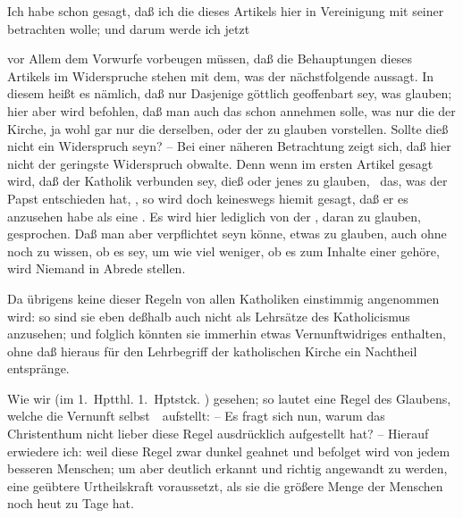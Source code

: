 Ich habe schon gesagt, daß ich die  dieses Artikels hier in Vereinigung mit seiner  betrachten wolle; und darum werde ich jetzt
\begin{aufza}
\item vor Allem dem Vorwurfe vorbeugen müssen, daß die Behauptungen dieses Artikels im Widerspruche stehen mit dem, was der nächstfolgende aussagt. In diesem heißt es nämlich, daß nur Dasjenige göttlich geoffenbart sey, was glauben; hier aber wird befohlen, daß man auch das schon annehmen solle, was nur die  der Kirche, ja wohl gar nur die  derselben, oder der  zu glauben vorstellen. Sollte dieß nicht ein Widerspruch seyn? -- Bei einer näheren Betrachtung zeigt sich, daß hier nicht der geringste Widerspruch obwalte. Denn wenn im ersten Artikel gesagt wird, daß der Katholik verbunden sey, dieß oder jenes zu glauben, \zB\ das, was der Papst entschieden hat, \udgl , so wird doch keineswegs hiemit gesagt, daß er es anzusehen habe als eine . Es wird hier lediglich von der , daran zu glauben, gesprochen. Daß man aber verpflichtet seyn könne, etwas zu glauben, auch ohne noch zu wissen, ob es  sey, um wie viel weniger, ob es zum Inhalte einer  gehöre, wird Niemand in Abrede stellen.
\item Da übrigens keine dieser Regeln von allen Katholiken einstimmig angenommen wird: so sind sie eben deßhalb auch nicht als Lehrsätze des Katholicismus anzusehen; und folglich könnten sie immerhin etwas Vernunftwidriges enthalten, ohne daß hieraus für den Lehrbegriff der katholischen Kirche ein Nachtheil entspränge.
\item Wie wir (im 1.~Hptthl. 1.~Hptstck. ) gesehen; so lautet eine Regel des Glaubens, welche die Vernunft selbst~\ aufstellt:  -- Es fragt sich nun, warum das Christenthum nicht lieber diese Regel ausdrücklich aufgestellt hat? -- Hierauf erwiedere ich: weil diese Regel zwar dunkel geahnet und befolget wird von jedem besseren Menschen; um aber deutlich erkannt und richtig angewandt zu werden, eine geübtere Urtheilskraft voraussetzt, als sie die größere Menge der Menschen noch heut zu Tage hat.

\end{aufza}
